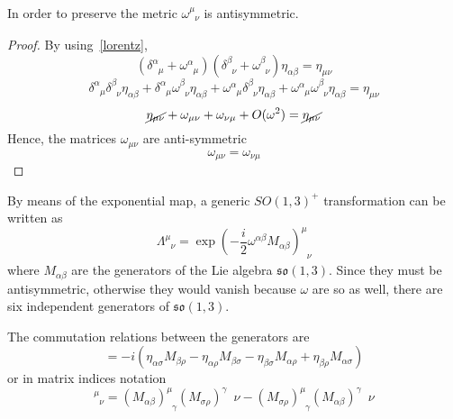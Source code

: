     In order to preserve the metric $\omega^{\mu}_{\phantom \mu \nu}$ is antisymmetric.
    \begin{proof}
        By using~\eqref{lorentz},
        \begin{equation*}
            (\delta^{\alpha}_{\phantom \alpha \mu} + \omega^{\alpha}_{\phantom \alpha \mu} )( \delta^{\beta}_{\phantom \beta \nu} + \omega^{\beta}_{\phantom \beta \nu} )\eta_{\alpha \beta} = \eta_{\mu \nu}
        \end{equation*}
        \begin{equation*}
            \delta^{\alpha}_{\phantom \alpha \mu} \delta^{\beta}_{\phantom \beta \nu} \eta_{\alpha \beta} + \delta^{\alpha}_{\phantom \alpha \mu} \omega^{\beta}_{\phantom \beta \nu} \eta_{\alpha \beta} + \omega^{\alpha}_{\phantom \alpha \mu} \delta^{\beta}_{\phantom \beta \nu} \eta_{\alpha \beta} + \omega^{\alpha}_{\phantom \alpha \mu} \omega^{\beta}_{\phantom \beta \nu} \eta_{\alpha \beta} = \eta_{\mu \nu}
        \end{equation*}
        \begin{equation*}
            \cancel{\eta_{\mu \nu}} + \omega_{\mu \nu} + \omega_{\nu\mu} + O(\omega^2) = \cancel{\eta_{\mu \nu}}
        \end{equation*}
        Hence, the matrices $\omega_{\mu\nu}$ are anti-symmetric
        \begin{equation*}
            \omega_{\mu \nu} = \omega_{\nu \mu}
        \end{equation*}
    \end{proof}

    By means of the exponential map, a generic $SO(1,3)^+$ transformation can be written as
    \begin{equation*}
        \Lambda^{\mu}_{\phantom \mu \nu} = \exp(- \frac{i}{2} \omega^{\alpha \beta} M_{\alpha \beta})^\mu_{\phantom \mu \nu}
    \end{equation*}
    where $M_{\alpha \beta}$ are the generators of the Lie algebra $\mathfrak{so} (1,3)$. Since they must be antisymmetric, otherwise they would vanish because $\omega$ are so as well, there are six independent generators of $\mathfrak{so} (1,3)$.


    The commutation relations between the generators are
    \begin{equation*}
        [M_{\alpha\beta}, M_{\sigma\rho}] = - i (\eta_{\alpha\sigma} M_{\beta \rho} - \eta_{\alpha\rho} M_{\beta\sigma} - \eta_{\beta\sigma} M_{\alpha\rho} + \eta_{\beta \rho} M_{\alpha \sigma})
    \end{equation*}
    or in matrix indices notation
    \begin{equation*}
        [M_{\alpha \beta}, M_{\sigma \rho}]^\mu_{\phantom \mu \nu} = (M_{\alpha\beta})^\mu_{\phantom \mu \gamma} (M_{\sigma \rho})^\gamma{\phantom \gamma \nu} - (M_{\sigma\rho})^\mu_{\phantom \mu \gamma} (M_{\alpha\beta})^\gamma{\phantom \gamma \nu}
    \end{equation*}

